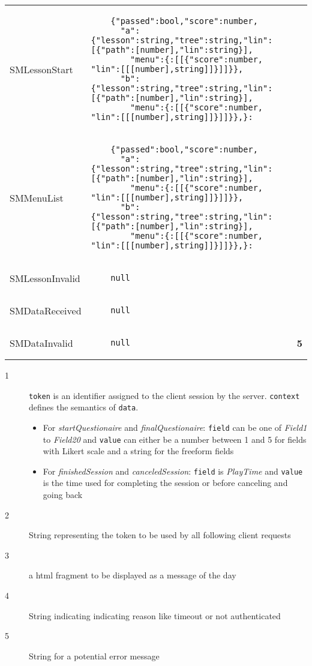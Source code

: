 \documentclass{scrartcl}
\begin{document}
\begin{tabular}{lll}
  SMLessonStart &
  \begin{lstlisting}
    {"passed":bool,"score":number,
      "a":{"lesson":string,"tree":string,"lin":[{"path":[number],"lin":string}],
        "menu":{:[[{"score":number, "lin":[[[number],string]]}]]}},
      "b":{"lesson":string,"tree":string,"lin":[{"path":[number],"lin":string}],
        "menu":{:[[{"score":number, "lin":[[[number],string]]}]]}},}:
  \end{lstlisting} \\
  SMMenuList &
  \begin{lstlisting}
    {"passed":bool,"score":number,
      "a":{"lesson":string,"tree":string,"lin":[{"path":[number],"lin":string}],
        "menu":{:[[{"score":number, "lin":[[[number],string]]}]]}},
      "b":{"lesson":string,"tree":string,"lin":[{"path":[number],"lin":string}],
        "menu":{:[[{"score":number, "lin":[[[number],string]]}]]}},}:
  \end{lstlisting} \\
  SMLessonInvalid &
  \begin{lstlisting}
    null
  \end{lstlisting} \\
  SMDataReceived &
  \begin{lstlisting}
    null
  \end{lstlisting} \\
  SMDataInvalid &
  \begin{lstlisting}
    null
  \end{lstlisting} & {\bfseries\footnotesize 5} \\
\end{tabular}

\begin{description}
\item[{\footnotesize 1}] \texttt{token} is an identifier assigned to the client session by the server. \texttt{context} defines the semantics of \texttt{data}.

  \begin{itemize}
  \item For \emph{startQuestionaire} and \emph{finalQuestionaire}: \texttt{field} can be one of \emph{Field1} to \emph{Field20} and \texttt{value} can either be a number between 1 and 5 for fields with Likert scale and a string for the freeform fields
  \item For \emph{finishedSession} and \emph{canceledSession}: \texttt{field} is \emph{PlayTime} and \texttt{value} is the time used for completing the session or before canceling and going back
  \end{itemize}
\item[{\footnotesize 2}] String representing the token to be used by all following client requests
\item[{\footnotesize 3}] a html fragment to be displayed as a message of the day
\item[{\footnotesize 4}] String indicating indicating reason like timeout or not authenticated
\item[{\footnotesize 5}] String for a potential error message
\end{description}
\end{document}
